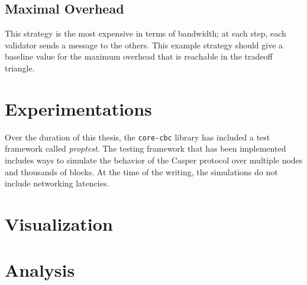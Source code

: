 \subsection{Maximal Overhead}
This strategy is the most expensive in terms of bandwidth; at each step, each
validator sends a message to the others. This example strategy should give a
baseline value for the maximum overhead that is reachable in the tradeoff
triangle.

\section{Experimentations}
Over the duration of this thesis, the \texttt{core-cbc} library has included a
test framework called \textit{proptest}. The testing framework that has been
implemented includes ways to simulate the behavior of the Casper protocol over
multiple nodes and thousands  of blocks. At the time of the
writing, the simulations do not include networking latencies.


\section{Visualization}
\section{Analysis}
